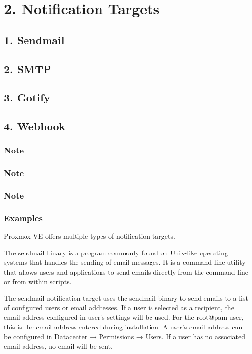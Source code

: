 \section{2. Notification Targets}

\subsection{1. Sendmail}

\subsection{2. SMTP}

\subsection{3. Gotify}

\subsection{4. Webhook}

\subsubsection{Note}

\subsubsection{Note}

\subsubsection{Note}

\subsubsection{Examples}

Proxmox VE offers multiple types of notification targets.

The sendmail binary is a program commonly found on Unix-like operating systems that handles the sending of email messages. It is a command-line utility that allows users and applications to send emails directly from the command line or from within scripts.

The sendmail notification target uses the sendmail binary to send emails to a list of configured users or email addresses. If a user is selected as a recipient, the email address configured in user’s settings will be used. For the root@pam user, this is the email address entered during installation. A user’s email address can be configured in Datacenter → Permissions → Users. If a user has no associated email address, no email will be sent.

